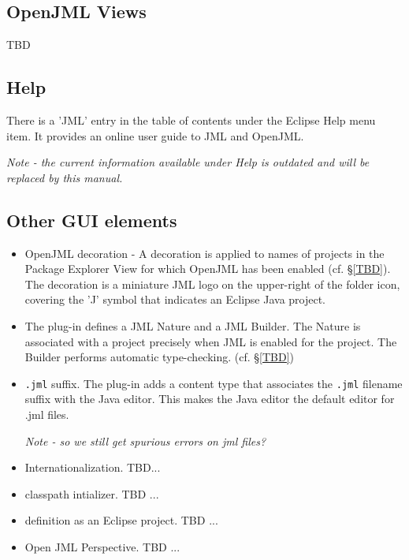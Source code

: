 \subsection{OpenJML Views}

TBD

\subsection{Help}
There is a 'JML' entry in the table of contents under the Eclipse Help menu item. It provides an online user guide to JML and OpenJML.

\textit{Note - the current information available under Help is outdated and will be replaced by this manual.}

\subsection{Other GUI elements}
\begin{itemize}
\item OpenJML decoration - A decoration is applied to names of projects in the Package Explorer View for which OpenJML has been enabled (cf. \S\ref{TBD}). The decoration is a miniature JML logo on the upper-right of the folder icon, covering the 'J' symbol that indicates an Eclipse Java project.
\item The plug-in defines a JML Nature and a JML Builder. The Nature is associated with a project precisely when JML is enabled for the project. The Builder performs automatic type-checking.  (cf. \S\ref{TBD})
\item \texttt{.jml} suffix. The plug-in adds a content type that associates the \texttt{.jml} filename suffix with the Java editor. This makes the Java editor the default editor for .jml files. 

\textit{Note - so we still get spurious errors on jml files?} %

\item Internationalization. TBD...
\item classpath intializer. TBD ...
\item definition as an Eclipse project. TBD ...
\item Open JML Perspective. TBD ...
\end{itemize}